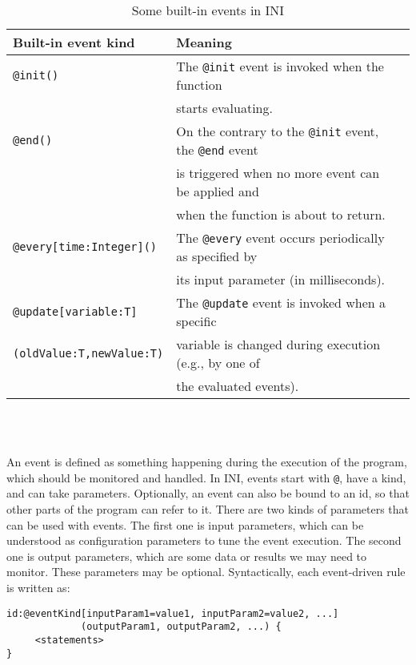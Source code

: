 \documentclass[runningheads,a4paper]{llncs}
\begin{document}
\begin{table}[h]
\centering
\begin{tabular} {|l|l|l|}
\hline
\textbf{Built-in event kind} & \textbf{Meaning}\\
\hline
\texttt{@init()} & The \texttt{@init} event is invoked when the function\\
~ & starts evaluating.\\
\hline
\texttt{@end()} & On the contrary to the \texttt{@init} event, the \texttt{@end} event\\
~ & is triggered when no more event can be applied and\\
~ & when the function is about to return.\\
\hline
\texttt{@every[time:Integer]()} & The \texttt{@every} event occurs periodically as specified by\\
~ & its input parameter (in milliseconds).\\
\hline
\texttt{@update[variable:T]} & The \texttt{@update} event is invoked when a specific\\
\texttt{(oldValue:T,newValue:T)} & variable is changed during execution (e.g., by one of\\
~ & the evaluated events).\\
\hline
\end{tabular}
\\~
\caption{Some built-in events in INI}
\label{tab:Events}
\end{table}

\vspace{-20pt}

An event is defined as something happening during the execution of the program, which should be monitored and handled. In INI, events start with \texttt{@}, have a kind, and can take parameters. Optionally, an event can also be bound to an id, so that other parts of the program can refer to it. There are two kinds of parameters that can be used with events. The first one is input parameters, which can be understood as configuration parameters to tune the event execution. The second one is output parameters, which are some data or results we may need to monitor. These parameters may be optional. Syntactically, each event-driven rule is written as:

\begin{lstlisting}[numbers=none]
id:@eventKind[inputParam1=value1, inputParam2=value2, ...]
             (outputParam1, outputParam2, ...) {
     <statements>
}
\end{lstlisting}
\end{document}
